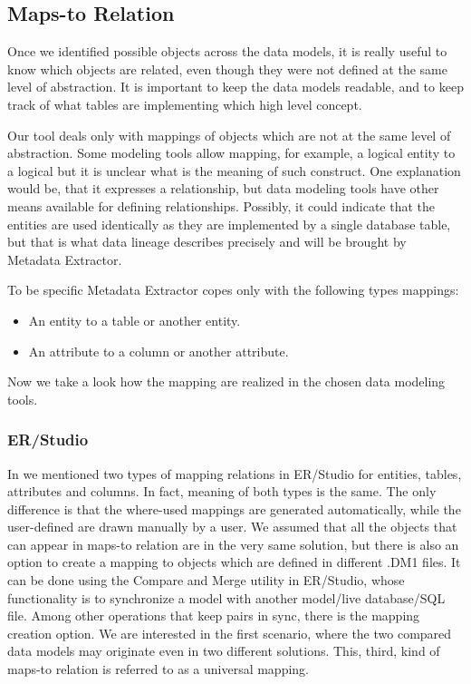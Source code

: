\subsection{Maps-to Relation}
\label{maps_to_analysis}

Once we identified possible objects across the data models, it is really useful to know which objects are related, even though they were not defined at the same level of abstraction. 
It is important to keep the data models readable, and to keep track of what tables are implementing which high level concept.

Our tool deals only with mappings of objects which are not at the same level of abstraction. 
Some modeling tools allow mapping, for example, a logical entity to a logical but it is unclear what is the meaning of such construct. 
One explanation would be, that it expresses a relationship, but data modeling tools have other means available for defining relationships. 
Possibly, it could indicate that the entities are used identically as they are implemented by a single database table, but that is what data lineage describes precisely and will be brought by Metadata Extractor.

To be specific Metadata Extractor copes only with the following types mappings: 
\begin{itemize}
	\item An entity to a table or another entity. 
	\item An attribute to a column or another attribute.
\end{itemize}
\label{allowed_mappings}

Now we take a look how the mapping are realized in the chosen data modeling tools.

\subsubsection{ER/Studio}

In  we mentioned two types of mapping relations in ER/Studio for  entities, tables, attributes and columns.
In fact, meaning of both types is the same. The only difference is that the where-used mappings are generated automatically, while the user-defined are drawn manually by a user. 
We assumed that all the objects that can appear in maps-to relation are in the very same solution, but there is also an option to create a mapping to objects which are defined in different .DM1 files. It can be done using the Compare and Merge utility in ER/Studio, whose functionality is to synchronize a model with another model/live database/SQL file. 
Among other operations that keep pairs in sync, there is the mapping creation option. 
We are interested in the first scenario, where the two compared data models may originate even in two different solutions. 
This, third, kind of maps-to relation is referred to as a universal mapping. \\

